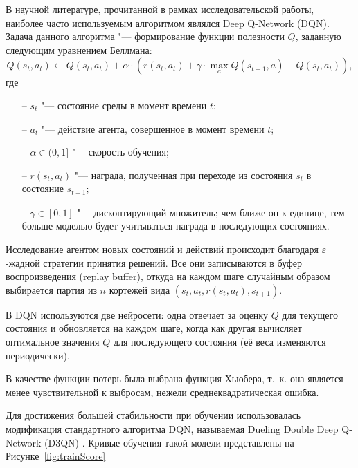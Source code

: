 В научной литературе, прочитанной в рамках исследовательской работы, наиболее часто используемым алгоритмом являлся Deep Q-Network (DQN). Задача данного алгоритма "--- формирование функции полезности \(Q\), заданную следующим уравнением Беллмана: 
\begin{equation}
	Q(s_t, a_t) \leftarrow Q(s_t, a_t) + \alpha \cdot (r(s_t, a_t) + \gamma \cdot \max_a Q(s_{t+1}, a) - Q(s_t, a_t)),
\end{equation} где 
\begin{itemize}
	\item[--] \(s_t\) "--- состояние среды в момент времени \(t\); 
	\item[--]  \(a_t\) "--- действие агента, совершенное в момент времени \(t\);
	\item[--] \(\alpha \in (0, 1]\) "--- скорость обучения;
	\item[--] \(r(s_t, a_t)\) "--- награда, полученная при переходе из состояния \(s_t\) в состояние \(s_{t+1}\);
	\item[--] \(\gamma \in [0, 1]\) "--- дисконтирующий множитель; чем ближе он к единице, тем больше моделью будет учитываться награда в последующих состояниях.
\end{itemize}

Исследование агентом новых состояний и действий происходит благодаря $\varepsilon$-жадной стратегии принятия решений. Все они записываются в буфер воспроизведения (replay buffer), откуда на каждом шаге случайным образом выбирается партия из \(n\) кортежей вида \((s_t, a_t, r(s_t, a_t), s_{t+1})\).

В DQN используются две нейросети: одна отвечает за оценку \(Q\) для текущего состояния и обновляется на каждом шаге, когда как другая вычисляет оптимальное значения \(Q\) для последующего состояния (её веса изменяются периодически).

В качестве функции потерь была выбрана функция Хьюбера, т.~к. она является менее чувствительной к выбросам, нежели среднеквадратическая ошибка.

Для достижения большей стабильности при обучении использовалась модификация стандартного алгоритма DQN, называемая Dueling Double Deep Q-Network (D3QN) \cite{wang2016dueling,hasselt2016deep}. Кривые обучения такой модели представлены на Рисунке~\ref{fig:trainScore}


